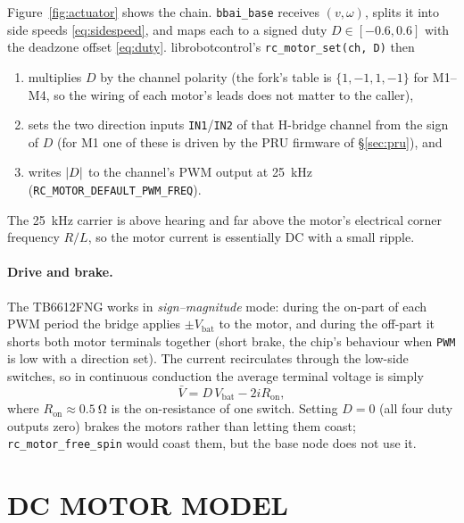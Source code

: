 Figure~\ref{fig:actuator} shows the chain. \texttt{bbai\_base} receives
$(v,\omega)$, splits it into side speeds \eqref{eq:sidespeed}, and maps each
to a signed duty $D\in[-0.6,0.6]$ with the deadzone offset \eqref{eq:duty}.
librobotcontrol's \texttt{rc\_motor\_set(ch, D)} then
\begin{enumerate}
\item multiplies $D$ by the channel polarity (the fork's table is
  $\{1,-1,1,-1\}$ for M1--M4, so the wiring of each motor's leads does not
  matter to the caller),
\item sets the two direction inputs \texttt{IN1}/\texttt{IN2} of that
  H-bridge channel from the sign of $D$ (for M1 one of these is driven by the
  PRU firmware of \S\ref{sec:pru}), and
\item writes $\left\lvert D \right\rvert$ to the channel's PWM output at \SI{25}{kHz}
  (\texttt{RC\_MOTOR\_DEFAULT\_PWM\_FREQ}).
\end{enumerate}
The \SI{25}{kHz} carrier is above hearing and far above the motor's
electrical corner frequency $R/L$, so the motor current is essentially DC
with a small ripple.

\paragraph{Drive and brake.} The TB6612FNG works in \emph{sign--magnitude}
mode: during the on-part of each PWM period the bridge applies
$\pm V_{\mathrm{bat}}$ to the motor, and during the off-part it shorts both
motor terminals together (short brake, the chip's behaviour when
\texttt{PWM} is low with a direction set). The current recirculates through
the low-side switches, so in continuous conduction the average terminal
voltage is simply
\begin{equation}\label{eq:vavg}
\bar V = D\,V_{\mathrm{bat}} - 2 i R_{\mathrm{on}},
\end{equation}
where $R_{\mathrm{on}}\approx\SI{0.5}{\ohm}$ is the on-resistance of one
switch. Setting $D=0$ (all four duty outputs zero) brakes the motors rather
than letting them coast; \texttt{rc\_motor\_free\_spin} would coast them,
but the base node does not use it.

\section{DC MOTOR MODEL}
\label{sec:motormodel}

